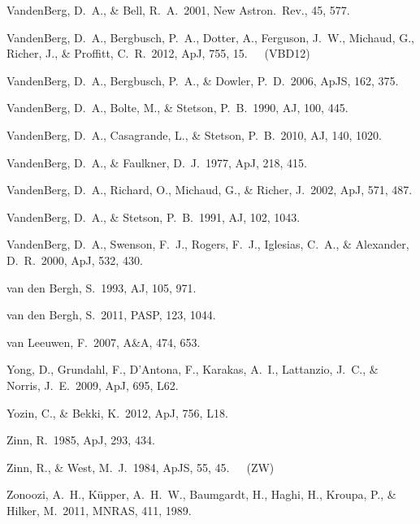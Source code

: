 \documentclass[12pt,preprint]{aastex}
\begin{document}
\begin{thebibliography}{}
VandenBerg, D.~A., \& Bell, R.~A.~2001, New Astron.~Rev., 45, 577.

VandenBerg, D.~A., Bergbusch, P.~A., Dotter, A., Ferguson, J.~W., Michaud, G.,
 Richer, J., \& Proffitt, C.~R.~2012, ApJ, 755, 15.\ \ \ (VBD12)

VandenBerg, D.~A., Bergbusch, P.~A., \& Dowler, P.~D.~2006, ApJS, 162, 375.

VandenBerg, D.~A., Bolte, M., \& Stetson, P.~B.~1990, AJ, 100, 445.


VandenBerg, D.~A., Casagrande, L., \& Stetson, P.~B.~2010, AJ, 140, 1020.


VandenBerg, D.~A., \& Faulkner, D.~J.~1977, ApJ, 218, 415.

VandenBerg, D.~A., Richard, O., Michaud, G., \& Richer, J.~2002, ApJ, 571, 487.

VandenBerg, D.~A., \& Stetson, P.~B.~1991, AJ, 102, 1043.

VandenBerg, D.~A., Swenson, F.~J., Rogers, F.~J., Iglesias, C.~A., \&
 Alexander, D.~R.~2000, ApJ, 532, 430.

van den Bergh, S.~1993, AJ, 105, 971.

van den Bergh, S.~2011, PASP, 123, 1044.

van Leeuwen, F.~2007, A\&A, 474, 653.


Yong, D., Grundahl, F., D'Antona, F., Karakas, A.~I., Lattanzio, J.~C., \&
 Norris, J.~E.~2009, ApJ, 695, L62.

Yozin, C., \& Bekki, K.~2012, ApJ, 756, L18.

Zinn, R.~1985, ApJ, 293, 434.

Zinn, R., \& West, M.~J.~1984, ApJS, 55, 45.\ \ \ (ZW)

Zonoozi, A.~H., K\"upper,  A.~H.~W., Baumgardt, H., Haghi, H., Kroupa, P.,
 \& Hilker, M.~2011, MNRAS, 411, 1989.

\end{thebibliography}
\end{document}
